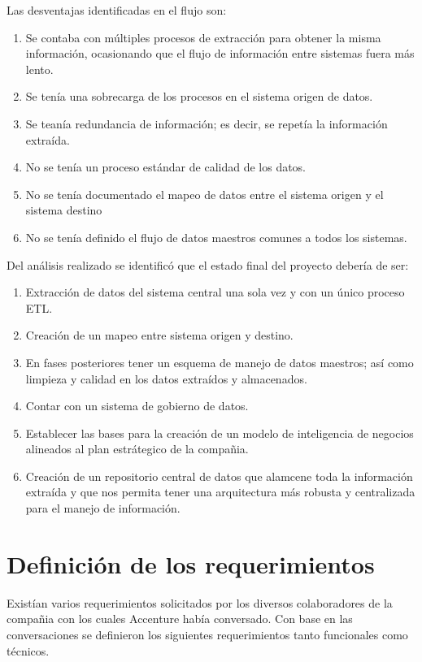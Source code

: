 Las desventajas identificadas en el flujo son:

\begin{enumerate}
\item Se contaba con múltiples procesos de extracción para obtener la misma
  información, ocasionando que el flujo de información entre sistemas fuera más
  lento.
\item Se tenía una sobrecarga de los procesos en el sistema origen de datos.
\item Se teanía redundancia de información; es decir, se repetía la información
  extraída.
\item No se tenía un proceso estándar de calidad de los datos.
\item No se tenía documentado el mapeo de datos entre el sistema origen y el
  sistema destino
\item No se tenía definido el flujo de datos maestros comunes a todos los sistemas.
\end{enumerate}

Del análisis realizado se identificó que el estado final del proyecto debería de
ser:

\begin{enumerate}
\item Extracción de datos del sistema central una sola vez y con un único
  proceso ETL.
\item Creación de un mapeo entre sistema origen y destino.
\item En fases posteriores tener un esquema de manejo de datos maestros; así
  como limpieza y calidad en los datos extraídos y almacenados.
\item Contar con un sistema de gobierno de datos.
\item Establecer las bases para la creación de un modelo de inteligencia de
  negocios alineados al plan estrátegico de la compañia.
\item Creación de un repositorio central de datos que alamcene toda la
  información extraída y que nos permita tener una arquitectura más robusta y
  centralizada para el manejo de información.
\end{enumerate}

\section{Definición de los requerimientos}

Existían varios requerimientos solicitados por los diversos colaboradores de la
compañia con los cuales Accenture había conversado. Con base en las
conversaciones se definieron los siguientes requerimientos tanto funcionales
como técnicos.

